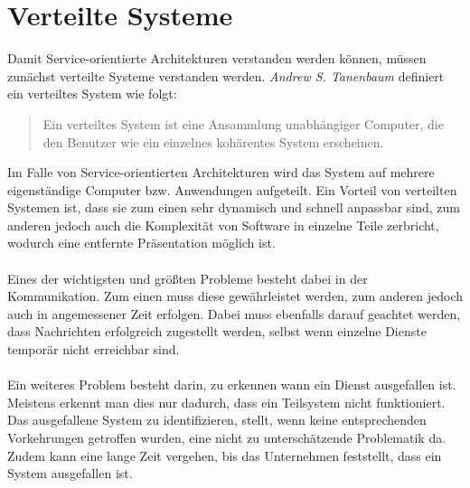 \section{Verteilte Systeme}
\label{sec:VerteilteAnwendungen}
Damit Service-orientierte Architekturen verstanden werden können, müssen zunächst verteilte Systeme verstanden werden. \textit{Andrew S. Tanenbaum} definiert ein verteiltes System wie folgt:
\begin{quotation}
    \frqq Ein verteiltes System ist eine Ansammlung unabhängiger Computer, die den Benutzer wie ein einzelnes kohärentes System erscheinen.\flqq\cite[S. 19]{tanenbaum:VerteilteSysteme}
\end{quotation}
Im Falle von Service-orientierten Architekturen wird das System auf mehrere eigenständige Computer bzw. Anwendungen aufgeteilt. Ein Vorteil von verteilten Systemen ist, dass sie zum einen sehr dynamisch und schnell anpassbar sind, zum anderen jedoch auch die Komplexität von Software in einzelne Teile zerbricht, wodurch eine entfernte Präsentation möglich ist.
\\\\
Eines der wichtigsten und größten Probleme besteht dabei in der Kommunikation. Zum einen muss diese gewährleistet werden, zum anderen jedoch auch in angemessener Zeit erfolgen. Dabei muss ebenfalls darauf geachtet werden, dass Nachrichten erfolgreich zugestellt werden, selbst wenn einzelne Dienste temporär nicht erreichbar sind.
\\\\
Ein weiteres Problem besteht darin, zu erkennen wann ein Dienst ausgefallen ist. Meistens erkennt man dies nur dadurch, dass ein Teilsystem nicht funktioniert. Das ausgefallene System zu identifizieren, stellt, wenn keine entsprechenden Vorkehrungen getroffen wurden, eine nicht zu unterschätzende Problematik da. Zudem kann eine lange Zeit vergehen, bis das Unternehmen feststellt, dass ein System ausgefallen ist. 

